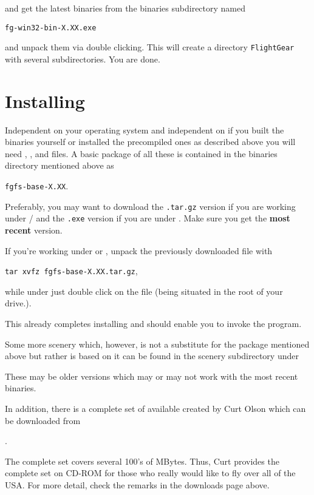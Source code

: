  \noindent
and get the latest binaries from the binaries subdirectory named

\texttt{fg-win32-bin-X.XX.exe}

 \noindent
and unpack them via double clicking. This will create a directory \texttt{FlightGear}
with several subdirectories. You are done.

\section{Installing }

Independent on your operating system and independent on if you
built the binaries yourself or installed the precompiled ones as
described above you will need , ,
and  files. A basic package of all these is contained
in the binaries directory mentioned above as

 \texttt{fgfs-base-X.XX}.

 \noindent
 Preferably, you may want to download the \texttt{.tar.gz} version
if you are working under / and the \texttt{.exe} version if you
are under . Make sure you get the \textbf{most recent} version.

If you're working under  or , unpack the
previously downloaded file with

        \texttt{tar xvfz fgfs-base-X.XX.tar.gz},

 \noindent
while under  just double click on the file (being situated in the
root of your \FlightGear drive.).

This already completes installing \FlightGear and should enable
you to invoke the program.

Some more scenery which, however, is not a substitute for the
package mentioned above but rather is based on it can be found in
the scenery subdirectory under


 \noindent
These may be older versions which may or may not work with the
most recent binaries.

In addition, there is a complete set of 
available created by Curt Olson which can be
downloaded from

.

 \noindent
The complete set covers several 100's of MBytes. Thus, Curt
provides the complete set on CD-ROM for those who really would
like to fly over all of the USA. For more detail, check the
remarks in the downloads page above.


